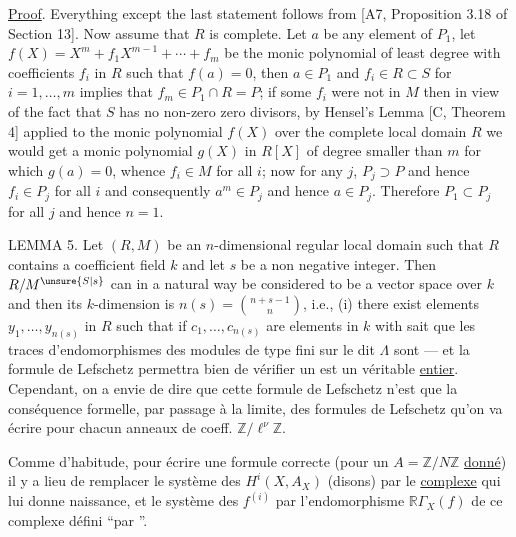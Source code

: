\uline{Proof}. Everything except the last statement follows from [A7, Proposition 3.18 of Section 13]. Now assume that $R$ is complete. Let $a$ be any element of $P_1$, let $f(X)=X^m+f_1X^{m-1}+\cdots+f_m$ be the monic polynomial of least degree with coefficients $f_i$ in $R$ such that $f(a)=0$, then $a\in P_1$ and $f_i\in R\subset S$ for $i=1,\ldots,m$ implies that $f_m\in P_1\cap R=P$; if some $f_i$ were not in $M$ then in view of the fact that $S$ has no non-zero zero divisors, by Hensel's Lemma [C, Theorem 4] applied to the monic polynomial $f(X)$ over the complete local domain $R$ we would get a monic polynomial $g(X)$ in $R[X]$ of degree smaller than $m$ for which $g(a)=0$, whence $f_i\in M$ for all $i$; now for any $j$, $P_j\supset P$ and hence $f_i\in P_j$ for all $i$ and consequently $a^m\in P_j$ and hence $a\in P_j$. Therefore $P_1\subset P_j$ for all $j$ and hence $n=1$.

LEMMA 5. Let $(R,M)$ be an $n$-dimensional regular local domain such that $R$ contains a coefficient field $k$ and let $s$ be a non negative integer. Then $R/M^{\unsure{S|s}}$ can in a natural way be considered to be a vector space over $k$ and then its $k$-dimension is $n(s)=\binom{n+s-1}{n}$, i.e., (i) there exist elements $y_1,\ldots,y_{n(s)}$ in $R$ such that if $c_1,\ldots,c_{n(s)}$ are elements in $k$ with
sait que les traces d'endomorphismes des modules de type fini sur le dit $\Lambda$ sont  --- et la formule de Lefschetz \unsure{(*)} permettra bien de vérifier un   est un véritable \uline{entier}. Cependant, on a envie de dire que cette formule de Lefschetz n'est que la conséquence formelle, par passage à la limite, des formules de Lefschetz qu'on va écrire pour chacun  anneaux de coeff. $\mathbb Z/\ell^\nu\mathbb Z$.

Comme d'habitude, pour écrire une formule correcte (pour un $A=\mathbb Z/N\mathbb Z$ \uline{donné}) il y a lieu de remplacer le système des $H^i(X,A_X)$ (disons) par le \uline{complexe}  qui lui donne naissance, et le système des $f^{(i)}$ par l'endomorphisme $\mathbb R\Gamma_X(f)$ de ce complexe défini ``par ''.


